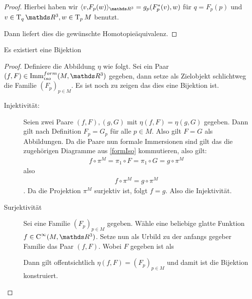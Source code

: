 \begin{Satz}
\begin{proof}
		Hierbei haben wir $ \scalar{v}{F_p(w)}_{\R^3} = g_p(F_p^\ast(v),w) $ für $ q =F_p(p) $ und $ v \in \tang{q}{\R^3},w\in \tang{p}{M} $ 
		benutzt.
		
		Dann liefert dies die gewünschte Homotopieäquivalenz.
	
	\end{proof}
\end{Satz}



\begin{Lem}
  Es existiert eine Bijektion
	
  \begin{proof}
    Definiere die Abbildung $ \eta $ wie folgt. Sei ein Paar
    $ (f,F) \in \Immfi{M}{\R^3}$ gegeben, dann setze als Zielobjekt
    schlichtweg die Familie $ (F_p)_{p\in M} $. Es ist noch zu zeigen
    das dies eine Bijektion ist.
    \begin{description}
    \item[Injektivität:] Seien zwei Paare $ (f,F),(g,G) $ mit
      $ \eta(f,F)=\eta(g,G) $ gegeben. Dann gilt nach Definition
      $ F_p = G_p $ für alle $ p\in M $. Also gilt $ F=G $ als
      Abbildungen. Da die Paare nun formale Immersionen sind gilt das
      die zugehörigen Diagramme aus \cref{formIso} kommutieren, also
      gilt:
      \begin{gather*}
        f \circ \pi^M = \pi_1 \circ F = \pi_1 \circ G = g \circ \pi^M
      \end{gather*}
      also
      \begin{gather*}
        f \circ \pi^M = g \circ \pi^M
      \end{gather*}.  Da die Projektion $ \pi^M $ surjektiv ist, folgt
      $ f=g $.  Also die Injektivität.
    \item[Surjektivität] Sei eine Familie $ (F_p)_{p\in M} $
      gegeben. Wähle eine beliebige glatte Funktion
      $ f\in \Cinfty{M}{\R^3} $. Setze nun als Urbild zu der anfangs
      gegeber Familie das Paar $ (f,F) $. Wobei $ F $ gegeben ist als
			 
      Dann gilt offentsichtlich $ \eta(f,F)=(F_p)_{p\in M} $ und damit
      ist die Bijektion konstruiert.
    \end{description}
  \end{proof}
\end{Lem}


